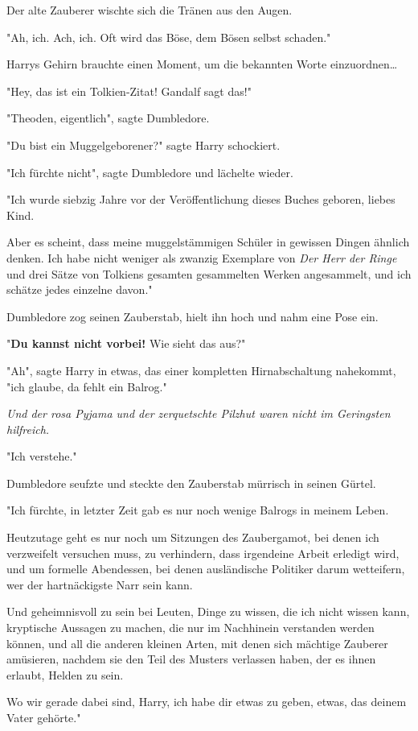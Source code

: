 {Der alte Zauberer wischte sich die Tränen aus den Augen.

"Ah, ich. Ach, ich. Oft wird das Böse, dem Bösen selbst schaden."

Harrys Gehirn brauchte einen Moment, um die bekannten Worte einzuordnen…

"Hey, das ist ein Tolkien-Zitat! Gandalf sagt das!"

"Theoden, eigentlich", sagte Dumbledore.

"Du bist ein Muggelgeborener?" sagte Harry schockiert.

"Ich fürchte nicht", sagte Dumbledore und lächelte wieder.

"Ich wurde siebzig Jahre vor der Veröffentlichung dieses Buches geboren, liebes Kind.

Aber es scheint, dass meine muggelstämmigen Schüler in gewissen Dingen ähnlich denken. Ich habe nicht weniger als zwanzig Exemplare von \emph{Der Herr der Ringe} und drei Sätze von Tolkiens gesamten gesammelten Werken angesammelt, und ich schätze jedes einzelne davon."

Dumbledore zog seinen Zauberstab, hielt ihn hoch und nahm eine Pose ein.

"\textbf{Du kannst nicht vorbei!} Wie sieht das aus?"

"Ah", sagte Harry in etwas, das einer kompletten Hirnabschaltung nahekommt, "ich glaube, da fehlt ein Balrog."

\emph{Und der rosa Pyjama und der zerquetschte Pilzhut waren nicht im Geringsten hilfreich.}

"Ich verstehe."

Dumbledore seufzte und steckte den Zauberstab mürrisch in seinen Gürtel.

"Ich fürchte, in letzter Zeit gab es nur noch wenige Balrogs in meinem Leben.

Heutzutage geht es nur noch um Sitzungen des Zaubergamot, bei denen ich verzweifelt versuchen muss, zu verhindern, dass irgendeine Arbeit erledigt wird, und um formelle Abendessen, bei denen ausländische Politiker darum wetteifern, wer der hartnäckigste Narr sein kann.

Und geheimnisvoll zu sein bei Leuten, Dinge zu wissen, die ich nicht wissen kann, kryptische Aussagen zu machen, die nur im Nachhinein verstanden werden können, und all die anderen kleinen Arten, mit denen sich mächtige Zauberer amüsieren, nachdem sie den Teil des Musters verlassen haben, der es ihnen erlaubt, Helden zu sein.

Wo wir gerade dabei sind, Harry, ich habe dir etwas zu geben, etwas, das deinem Vater gehörte."

}
